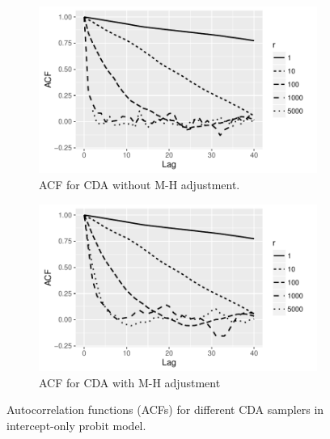 \documentclass[10pt]{article}
\begin{document}


\begin{figure}[H]
  \begin{subfigure}[b]{0.49\textwidth}
 \includegraphics[width=1\textwidth]{probit_demo_acf_prop.pdf}
  \caption{ACF for CDA without M-H adjustment.}
 \label{probit_demo_intercept_proposal}
\end{subfigure}
  \hfill
   \begin{subfigure}[b]{0.49\textwidth}
 \includegraphics[width=1\textwidth]{probit_demo_acf.pdf}
  \caption{ACF for CDA with M-H adjustment}
   \label{probit_demo_intercept_posteriorsample}
\end{subfigure}
 \caption{Autocorrelation functions (ACFs) for different CDA samplers in intercept-only probit model.}
 \label{probit_demo_intercept}
 \end{figure}
\end{document}
